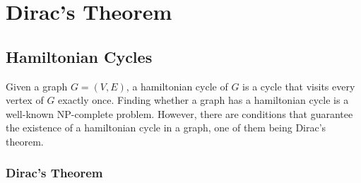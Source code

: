 
\chapter{Dirac's Theorem}

\section{Hamiltonian Cycles}

Given a graph $G = (V, E)$, a hamiltonian cycle of $G$ is a cycle that visits every vertex of $G$ exactly once.
Finding whether a graph has a hamiltonian cycle is a well-known NP-complete problem. 
However, there are conditions that guarantee the existence of a hamiltonian cycle in a graph, one of them being Dirac's theorem.

\subsection{Dirac's Theorem}

\cite{dirac1952}